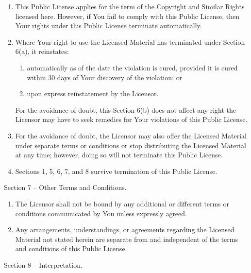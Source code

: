 \documentclass[]{scrbook}
\begin{document}
\begin{enumerate}
\def\labelenumi{\alph{enumi}.}
\item
  This Public License applies for the term of the Copyright and Similar
  Rights licensed here. However, if You fail to comply with this Public
  License, then Your rights under this Public License terminate
  automatically.
\item
  Where Your right to use the Licensed Material has terminated under
  Section 6(a), it reinstates:

  \begin{enumerate}
  \def\labelenumii{\arabic{enumii}.}
  \item
    automatically as of the date the violation is cured, provided it is
    cured within 30 days of Your discovery of the violation; or
  \item
    upon express reinstatement by the Licensor.
  \end{enumerate}

  For the avoidance of doubt, this Section 6(b) does not affect any
  right the Licensor may have to seek remedies for Your violations of
  this Public License.
\item
  For the avoidance of doubt, the Licensor may also offer the Licensed
  Material under separate terms or conditions or stop distributing the
  Licensed Material at any time; however, doing so will not terminate
  this Public License.
\item
  Sections 1, 5, 6, 7, and 8 survive termination of this Public License.
\end{enumerate}

Section 7 -- Other Terms and Conditions.

\begin{enumerate}
\def\labelenumi{\alph{enumi}.}
\item
  The Licensor shall not be bound by any additional or different terms
  or conditions communicated by You unless expressly agreed.
\item
  Any arrangements, understandings, or agreements regarding the Licensed
  Material not stated herein are separate from and independent of the
  terms and conditions of this Public License.
\end{enumerate}

Section 8 -- Interpretation.
\end{document}
